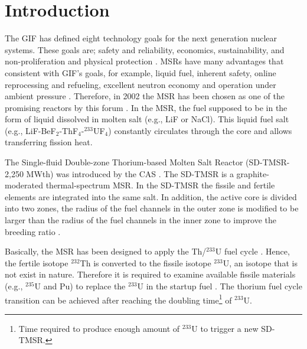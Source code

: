 \section{Introduction}
The \gls{GIF} has defined eight technology goals for the next generation nuclear systems. These goals are; safety and reliability, economics, sustainability, and non-proliferation and physical protection \cite{doe2002technology}. \glspl{MSR} have many advantages that consistent with \gls{GIF}'s goals, for example, liquid fuel, inherent safety, online reprocessing and refueling, excellent neutron economy and operation under ambient pressure \cite{siemer2015molten,rosenthal1970molten}. Therefore, in 2002 the \gls{MSR} has been chosen as one of the promising reactors by this forum \cite{doe2002technology,pioro2016handbook}.
In the \gls{MSR}, the fuel supposed to be in the form of liquid dissolved in molten salt (e.g., LiF or NaCl). This liquid fuel salt (e.g., LiF-BeF$_2$-ThF$_4$-$^{233}$UF$_4$) constantly circulates through the core and allows transferring fission heat. 
 
The Single-fluid Double-zone Thorium-based Molten Salt Reactor (SD-TMSR-2,250 MWth) was introduced by the \gls{CAS} \cite{li_optimization_2018}. The SD-TMSR is a graphite-moderated thermal-spectrum MSR. In the SD-TMSR the fissile and fertile elements are integrated into the same salt. In addition, the active core is divided into two zones, the radius of the fuel channels in the outer zone is modified to be larger than the radius of the fuel channels in the inner zone to improve the breeding ratio \cite{nuttin2005potential,li_optimization_2018}.

Basically, the \gls{MSR} has been designed to apply the Th/$^{233}$U fuel cycle \cite{rykhlevskii2019modeling,nuttin2005potential,merle2004scenarios,rosenthal1970molten}. Hence, the fertile isotope $^{232}$Th is converted to the fissile isotope $^{233}$U, an isotope that is not exist in nature. Therefore it is required to examine available fissile materials (e.g., $^{235}$U and Pu) to replace the $^{233}$U in the startup fuel \cite{betzler2016modeling,zou2018transition}. The thorium fuel cycle transition can be achieved after reaching the doubling time\footnote{Time required to produce enough amount of $^{233}$U to trigger a new SD-TMSR.} of $^{233}$U.

